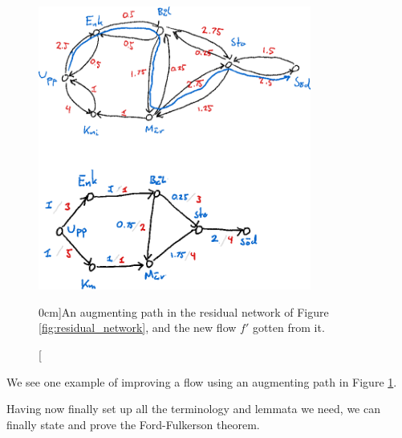\documentclass[nobib]{tufte-handout}
\begin{document}
\begin{figure}
    \centering
    \includegraphics[width=0.8\textwidth]{graphics/L7_flows/augmenting_path.png}
    \caption[][0cm]{An augmenting path in the residual network of Figure \ref{fig:residual_network}, and the new flow $f'$ gotten from it.}
    \label{fig:augmenting_path}
\end{figure}

We see one example of improving a flow using an augmenting path in Figure \ref{fig:augmenting_path}.

Having now finally set up all the terminology and lemmata we need, we can finally state and prove the Ford-Fulkerson theorem.
\end{document}
